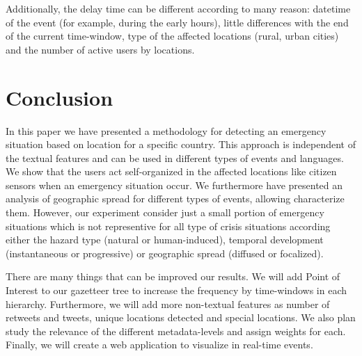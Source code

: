 \documentclass[sigconf]{acmart}
\begin{document}
Additionally, the delay time can be different according to many reason: datetime of the event (for example, during the early hours), little differences with the end of the current time-window, type of the affected locations (rural, urban cities) and the number of active users by locations.

	

\section{Conclusion}

In this paper we have presented a methodology for detecting an emergency situation based on location for a specific country. This approach is independent of the textual features and can be used in different types of events and languages. We show that the users act self-organized in the affected locations like citizen sensors when an emergency situation occur. We furthermore have presented an analysis of geographic spread for different types of events, allowing characterize them. However, our experiment consider just a small portion of emergency situations which is not representive for all type of crisis situations according either the hazard type (natural or human-induced), temporal development (instantaneous or progressive) or geographic spread (diffused or focalized).

There are many things that can be improved our results. We will add Point of Interest to our gazetteer tree to increase the frequency by time-windows in each hierarchy. Furthermore, we will add more non-textual features as number of retweets and tweets, unique locations detected and special locations. We also plan study the relevance of the different metadata-levels and assign weights for each. Finally, we will create a web application to visualize in real-time events.

\begin{acks}
	
\end{acks}




 
\end{document}
